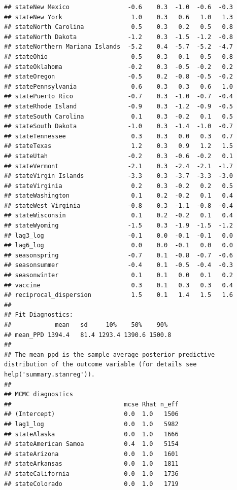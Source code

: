 \documentclass[
]{book}
\begin{document}
\begin{verbatim}
## stateNew Mexico                -0.6    0.3  -1.0  -0.6  -0.3
## stateNew York                   1.0    0.3   0.6   1.0   1.3
## stateNorth Carolina             0.5    0.3   0.2   0.5   0.8
## stateNorth Dakota              -1.2    0.3  -1.5  -1.2  -0.8
## stateNorthern Mariana Islands  -5.2    0.4  -5.7  -5.2  -4.7
## stateOhio                       0.5    0.3   0.1   0.5   0.8
## stateOklahoma                  -0.2    0.3  -0.5  -0.2   0.2
## stateOregon                    -0.5    0.2  -0.8  -0.5  -0.2
## statePennsylvania               0.6    0.3   0.3   0.6   1.0
## statePuerto Rico               -0.7    0.3  -1.0  -0.7  -0.4
## stateRhode Island              -0.9    0.3  -1.2  -0.9  -0.5
## stateSouth Carolina             0.1    0.3  -0.2   0.1   0.5
## stateSouth Dakota              -1.0    0.3  -1.4  -1.0  -0.7
## stateTennessee                  0.3    0.3   0.0   0.3   0.7
## stateTexas                      1.2    0.3   0.9   1.2   1.5
## stateUtah                      -0.2    0.3  -0.6  -0.2   0.1
## stateVermont                   -2.1    0.3  -2.4  -2.1  -1.7
## stateVirgin Islands            -3.3    0.3  -3.7  -3.3  -3.0
## stateVirginia                   0.2    0.3  -0.2   0.2   0.5
## stateWashington                 0.1    0.2  -0.2   0.1   0.4
## stateWest Virginia             -0.8    0.3  -1.1  -0.8  -0.4
## stateWisconsin                  0.1    0.2  -0.2   0.1   0.4
## stateWyoming                   -1.5    0.3  -1.9  -1.5  -1.2
## lag3_log                       -0.1    0.0  -0.1  -0.1   0.0
## lag6_log                        0.0    0.0  -0.1   0.0   0.0
## seasonspring                   -0.7    0.1  -0.8  -0.7  -0.6
## seasonsummer                   -0.4    0.1  -0.5  -0.4  -0.3
## seasonwinter                    0.1    0.1   0.0   0.1   0.2
## vaccine                         0.3    0.1   0.3   0.3   0.4
## reciprocal_dispersion           1.5    0.1   1.4   1.5   1.6
## 
## Fit Diagnostics:
##            mean   sd     10%    50%    90% 
## mean_PPD 1394.4   81.4 1293.4 1390.6 1500.8
## 
## The mean_ppd is the sample average posterior predictive distribution of the outcome variable (for details see help('summary.stanreg')).
## 
## MCMC diagnostics
##                               mcse Rhat n_eff
## (Intercept)                   0.0  1.0   1506
## lag1_log                      0.0  1.0   5982
## stateAlaska                   0.0  1.0   1666
## stateAmerican Samoa           0.4  1.0   5154
## stateArizona                  0.0  1.0   1601
## stateArkansas                 0.0  1.0   1811
## stateCalifornia               0.0  1.0   1736
## stateColorado                 0.0  1.0   1719

\end{verbatim}
\end{document}
